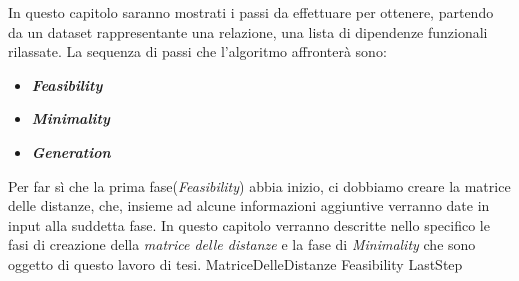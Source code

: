 In questo capitolo saranno mostrati i passi da effettuare per ottenere, partendo da un dataset rappresentante una relazione, una lista di dipendenze funzionali rilassate.
La sequenza di passi che l'algoritmo affronterà sono:
\begin{itemize}
	\item \textbf{\emph{Feasibility}}
	\item \textbf{\emph{Minimality}}
	\item \textbf{\emph{Generation}}
\end{itemize}
Per far sì che la prima fase(\emph{Feasibility}) abbia inizio, ci dobbiamo creare la matrice delle distanze, che, insieme ad alcune informazioni aggiuntive verranno date in input alla suddetta fase.
In questo capitolo verranno descritte nello specifico le fasi di creazione della \emph{matrice delle distanze} e la fase di \emph{Minimality} che sono oggetto di questo lavoro di tesi.
{MatriceDelleDistanze}
{Feasibility}
{LastStep}